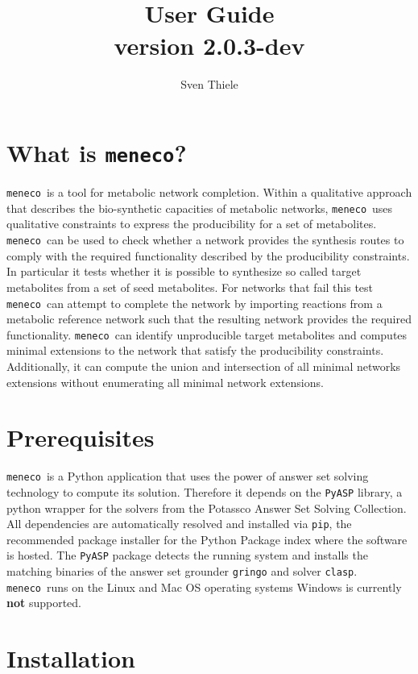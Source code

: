 \documentclass{article}
\title{ \meneco  \\
User Guide \\
version 2.0.3-dev
}
\author{Sven Thiele}
\date{}
\newcommand\meneco{\texttt{meneco}}
\begin{document}
\maketitle

\section{What is \meneco?}

\meneco\ is a tool for metabolic network completion.
Within a qualitative approach that describes the bio-synthetic capacities of metabolic networks,
 \meneco\ uses qualitative constraints to express the producibility for a set of metabolites.
\meneco\ can be used to check whether a network provides the synthesis routes to comply
 with the required functionality described by the producibility constraints.
In particular it tests whether it is possible to synthesize so called target metabolites from a set of seed metabolites.
For networks that fail this test \meneco\ can attempt to complete the network by importing reactions
from a metabolic reference network such that the resulting network provides the required functionality.
\meneco\ can identify unproducible target metabolites and computes minimal extensions to the network that satisfy the producibility constraints.
Additionally, it can compute the union and intersection of all minimal networks extensions without enumerating all minimal network extensions.


\section{Prerequisites}
\meneco\ is a Python application that uses the power of answer set solving technology to compute its solution.
Therefore it depends on the \texttt{PyASP} library, a python wrapper for the solvers from the Potassco Answer Set Solving Collection.
All dependencies are automatically resolved and installed via \texttt{pip}, the recommended package installer for the Python Package index where the software is hosted.
The \texttt{PyASP} package detects the running system and installs the matching binaries of the answer set grounder \texttt{gringo} and solver \texttt{clasp}.
\meneco\ runs on the Linux and Mac OS operating systems Windows is currently {\bf not} supported.


\section{Installation}
\end{document}

